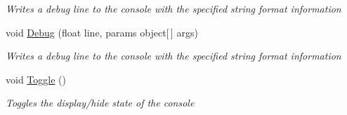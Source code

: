 \begin{DoxyCompactItemize}
\begin{DoxyCompactList}\small\item\em Writes a debug line to the console with the specified string format information \end{DoxyCompactList}\item 
void \hyperlink{class_midnight_blue_1_1_engine_1_1_m_b_console_a5895255e34603b7957c05313cc0e5639}{Debug} (float line, params object\mbox{[}$\,$\mbox{]} args)
\begin{DoxyCompactList}\small\item\em Writes a debug line to the console with the specified string format information \end{DoxyCompactList}\item 
void \hyperlink{class_midnight_blue_1_1_engine_1_1_m_b_console_a502833c7c57a512688da2e7771401df8}{Toggle} ()
\begin{DoxyCompactList}\small\item\em Toggles the display/hide state of the console \end{DoxyCompactList}\end{DoxyCompactItemize}

